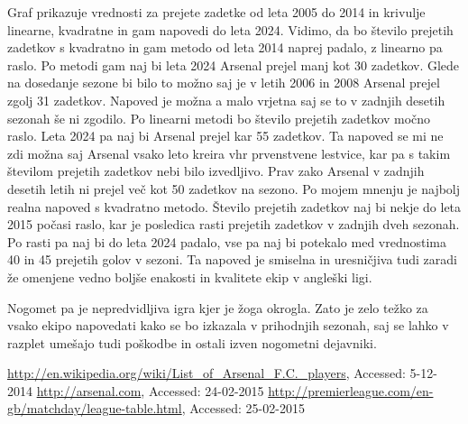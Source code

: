 \documentclass[11pt,a4paper]{article}
\begin{document}

Graf prikazuje vrednosti za prejete zadetke od leta 2005 do 2014 in krivulje linearne, kvadratne in gam napovedi do leta 2024. Vidimo, da bo število prejetih zadetkov s kvadratno in gam metodo od leta 2014 naprej padalo, z linearno pa raslo. Po metodi gam naj bi leta 2024 Arsenal prejel manj kot 30 zadetkov. Glede na dosedanje sezone bi bilo to možno saj je v letih 2006 in 2008 Arsenal prejel zgolj 31 zadetkov. Napoved je možna a malo vrjetna saj se to v zadnjih desetih sezonah še ni zgodilo. Po linearni metodi bo število prejetih zadetkov močno raslo. Leta 2024 pa naj bi Arsenal prejel kar 55 zadetkov. Ta napoved se mi ne zdi možna saj Arsenal vsako leto kreira vhr prvenstvene lestvice, kar pa s takim številom prejetih zadetkov nebi bilo izvedljivo. Prav zako Arsenal v zadnjih desetih letih ni prejel več kot 50 zadetkov na sezono. Po mojem mnenju je najbolj realna napoved s kvadratno metodo. Število prejetih zadetkov naj bi nekje do leta 2015 počasi raslo, kar je posledica rasti prejetih zadetkov v zadnjih dveh sezonah. Po rasti pa naj bi do leta 2024 padalo, vse pa naj bi potekalo med vrednostima 40 in 45 prejetih golov v sezoni. Ta napoved je smiselna in uresničjiva tudi zaradi že omenjene vedno boljše enakosti in  kvalitete ekip v angleški ligi. 

Nogomet pa je nepredvidljiva igra kjer je žoga okrogla. Zato je zelo težko za vsako ekipo napovedati kako se bo izkazala v prihodnjih sezonah, saj se lahko v razplet umešajo tudi poškodbe in ostali izven nogometni dejavniki.

\begin{thebibliography}{9}

  \url{http://en.wikipedia.org/wiki/List_of_Arsenal_F.C._players},
  {Accessed: 5-12-2014}
  \url{http://arsenal.com},
  {Accessed: 24-02-2015}
  \url{http://premierleague.com/en-gb/matchday/league-table.html},
  {Accessed: 25-02-2015}

\end{thebibliography}
  
\end{document}
